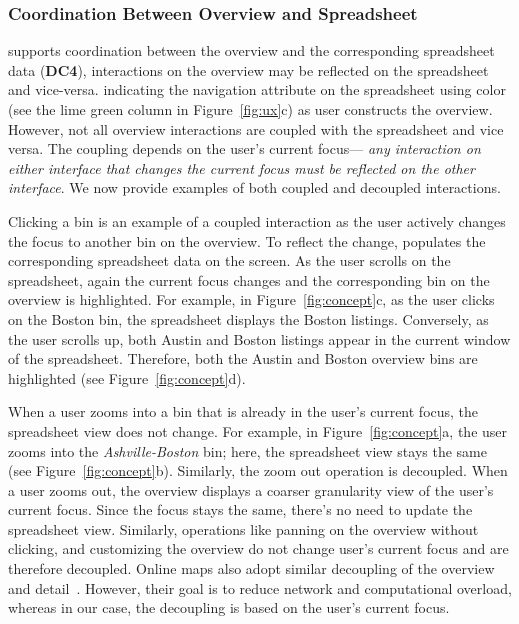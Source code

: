 \subsubsection{Coordination Between Overview and Spreadsheet}
\noah supports coordination
between the overview and the
corresponding spreadsheet data (\textbf{DC4}),
\ie interactions on the overview
may be reflected on the spreadsheet and vice-versa.
 indicating the navigation attribute on the spreadsheet
using color (see the lime green column in Figure~\ref{fig:ux}c)
as user constructs the overview. However, not all overview interactions are coupled
with the spreadsheet and vice versa.
The coupling depends on the user's current
focus---\emph{ any interaction on
either interface
that changes the current focus must be reflected
on the other interface}.
We now provide examples of both
coupled and decoupled interactions.

Clicking a bin is an example of a coupled interaction
as the user actively changes the focus
to another bin on the overview.
To reflect the change, \noah populates
the corresponding spreadsheet data
on the screen.
As the user scrolls on the spreadsheet,
again the current focus changes
and the corresponding bin on the overview is highlighted.
For example, in Figure~\ref{fig:concept}c,
as the user clicks on the Boston bin,
the spreadsheet displays the Boston listings.
Conversely, as the user scrolls up,
both Austin and Boston listings appear in the current window of the spreadsheet.
Therefore, both the Austin and Boston overview
bins are highlighted
(see Figure~\ref{fig:concept}d).

When a user zooms into a bin
that is already in the user's current focus,
the spreadsheet view does not change.
For example, in Figure~\ref{fig:concept}a,
the user zooms into the \emph{Ashville-Boston} bin;
here, the spreadsheet view stays the same
(see Figure~\ref{fig:concept}b).
Similarly, the zoom out operation is decoupled.
When a user zooms out,
the overview displays
a coarser granularity view
of the user's current focus.
Since the focus stays the same,
there's no need to update the spreadsheet view.
Similarly, operations like panning on the overview without clicking,
and customizing the overview
do not change user's current focus and are therefore decoupled.
Online maps also adopt similar
decoupling of the overview and detail~\cite{cockburn2009review}.
However, their goal is to reduce network
and computational overload, whereas in our case,
the decoupling is based on the user's current focus.

